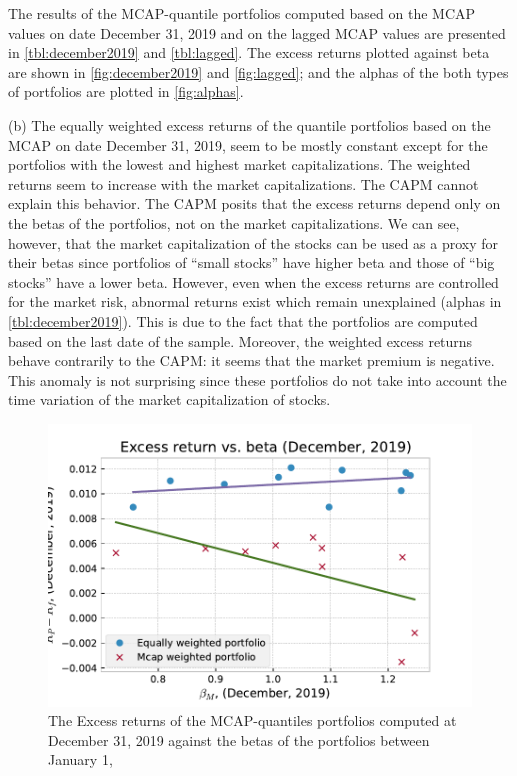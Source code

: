 \documentclass[10pt]{article}
\newenvironment{exercise}[2][Exercise]{\begin{trivlist}
  \item[\hskip \labelsep {\bfseries #1}\hskip \labelsep {\bfseries #2.}]}{\end{trivlist}}
\begin{document}
\begin{exercise}{2}

  The results of the MCAP-quantile portfolios computed based on the MCAP values
  on date December 31, 2019 and on the lagged MCAP values are presented in
  \autoref{tbl:december2019} and \autoref{tbl:lagged}. The excess returns
  plotted against beta are shown in \autoref{fig:december2019} and
  \autoref{fig:lagged}; and the alphas of the both types of portfolios are plotted in
\autoref{fig:alphas}.

  (b) The equally weighted excess returns of the quantile portfolios based on the
  MCAP on date December 31, 2019, seem to be mostly constant except for the
  portfolios with the lowest and highest market capitalizations. The weighted
  returns seem to increase with the market capitalizations. The CAPM cannot
  explain this behavior. The CAPM posits that the excess returns depend only on
  the betas of the portfolios, not on the market capitalizations. We can see,
  however, that the market capitalization of the stocks can be used as a proxy
  for their betas since portfolios of ``small stocks'' have higher beta and
  those of ``big stocks'' have a lower beta. However, even when the excess
  returns are controlled for the market risk, abnormal returns exist which remain
  unexplained (alphas in \autoref{tbl:december2019}). This is due to the fact
  that the portfolios are computed based on the last date of the sample.
  Moreover, the weighted excess returns behave contrarily to the CAPM: it seems
  that the market premium is negative. This anomaly is not surprising since
  these portfolios do not take into account the time variation of the market
  capitalization of stocks.
  \begin{figure}[n]
    \centering
    \includegraphics[width=0.7\linewidth]{december2019.pdf}
    \caption{The Excess returns of the MCAP-quantiles portfolios computed at
      December 31, 2019 against the betas of the portfolios between January 1,
}
\end{figure}
\end{exercise}
\end{document}
